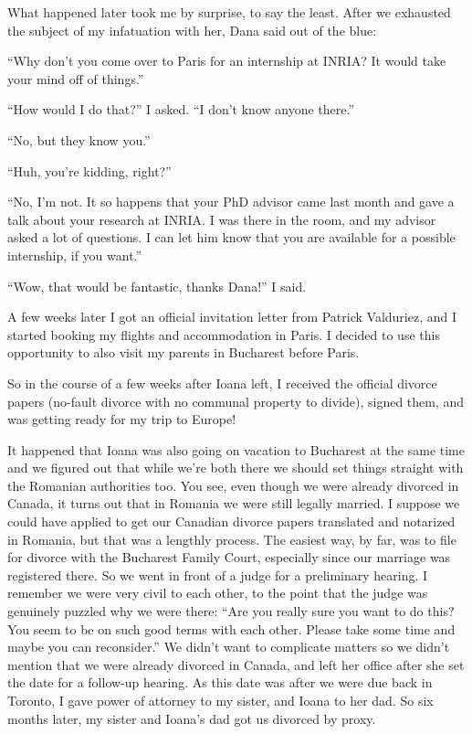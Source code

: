 \documentclass[12pt]{book}
\begin{document}
What happened later took me by surprise, to say the least. After we
exhausted the subject of my infatuation with her, Dana said out of the
blue:

``Why don't you come over to Paris for an internship at INRIA? It would
take your mind off of things.''

``How would I do that?'' I asked. ``I don't know anyone there.''

``No, but they know you.''

``Huh, you're kidding, right?''

``No, I'm not. It so happens that your PhD advisor came last month and
gave a talk about your research at INRIA. I was there in the room, and
my advisor asked a lot of questions. I can let him know that you are
available for a possible internship, if you want.''

``Wow, that would be fantastic, thanks Dana!'' I said.

A few weeks later I got an official invitation letter from Patrick
Valduriez, and I started booking my flights and accommodation in Paris.
I decided to use this opportunity to also visit my parents in Bucharest
before Paris.

So in the course of a few weeks after Ioana left, I received the
official divorce papers (no-fault divorce with no communal property to
divide), signed them, and was getting ready for my trip to Europe!

It happened that Ioana was also going on vacation to Bucharest at the
same time and we figured out that while we're both there we should set
things straight with the Romanian authorities too. You see, even though
we were already divorced in Canada, it turns out that in Romania we were
still legally married. I suppose we could have applied to get our
Canadian divorce papers translated and notarized in Romania, but that
was a lengthly process. The easiest way, by far, was to file for divorce
with the Bucharest Family Court, especially since our marriage was
registered there. So we went in front of a judge for a preliminary
hearing. I remember we were very civil to each other, to the point that
the judge was genuinely puzzled why we were there: ``Are you really sure
you want to do this? You seem to be on such good terms with each other.
Please take some time and maybe you can reconsider.'' We didn't want to
complicate matters so we didn't mention that we were already divorced in
Canada, and left her office after she set the date for a follow-up
hearing. As this date was after we were due back in Toronto, I gave
power of attorney to my sister, and Ioana to her dad. So six months
later, my sister and Ioana's dad got us divorced by proxy.
\end{document}
